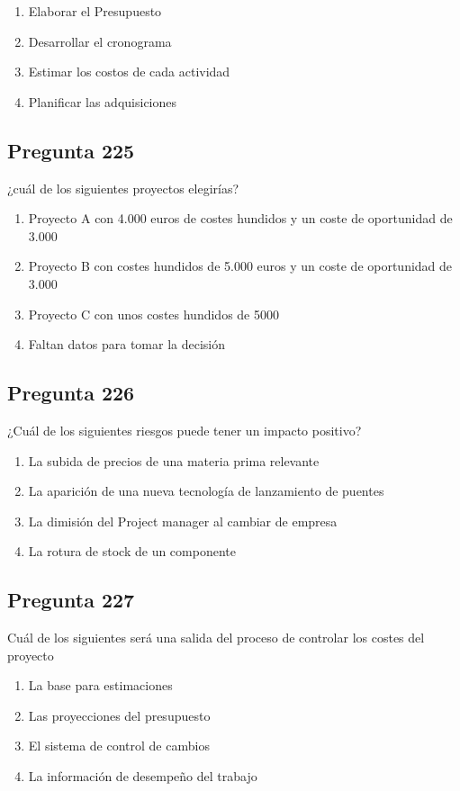 \documentclass[11pt,a4paper]{article}
\begin{document}
\begin{enumerate}[label=\alph*)]
  \item Elaborar el Presupuesto
  \item Desarrollar el cronograma
  \item Estimar los costos de cada actividad
  \item Planificar las adquisiciones
\end{enumerate}

\subsection*{Pregunta 225}
¿cuál de los siguientes proyectos elegirías?

\begin{enumerate}[label=\alph*)]
  \item Proyecto A con 4.000 euros de costes hundidos y un coste de oportunidad de 3.000
  \item Proyecto B con costes hundidos de 5.000 euros y un coste de oportunidad de 3.000
  \item Proyecto C con unos costes hundidos de 5000
  \item Faltan datos para tomar la decisión
\end{enumerate}

\subsection*{Pregunta 226}
¿Cuál de los siguientes riesgos puede tener un impacto positivo?

\begin{enumerate}[label=\alph*)]
  \item La subida de precios de una materia prima relevante
  \item La aparición de una nueva tecnología de lanzamiento de puentes
  \item La dimisión del Project manager al cambiar de empresa
  \item La rotura de stock de un componente
\end{enumerate}

\subsection*{Pregunta 227}
Cuál de los siguientes será una salida del proceso de controlar los costes del proyecto

\begin{enumerate}[label=\alph*)]
  \item La base para estimaciones
  \item Las proyecciones del presupuesto
  \item El sistema de control de cambios
  \item La información de desempeño del trabajo
\end{enumerate}
\end{document}

